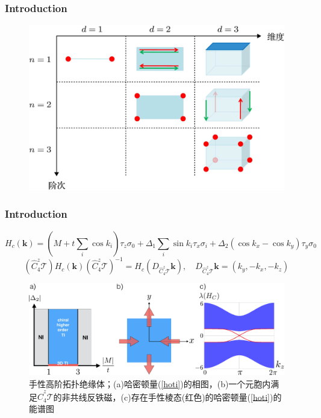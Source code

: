 \documentclass[10pt,aspectratio=169]{beamer} %
\begin{document}
\begin{frame}
	\frametitle{Introduction}
	\begin{figure}[h]
		\centering
		\includegraphics[scale=1.4]{pic/fig6}
	\end{figure}
\end{frame}
\begin{frame}
	\frametitle{Introduction}
	\begin{equation}
	H_c(\mathbf{k})=(M+t\sum_i\cos k_i)\tau_z\sigma_0+\Delta_1\sum_i\sin k_i\tau_x\sigma_i+\Delta_2(\cos k_x-\cos k_y)\tau_y\sigma_0\label{hoti}
	\end{equation}
	\begin{equation}
	(\hat{C}_4^z\mathcal{T})H_c(\mathbf{k})(\hat{C}_4^z\mathcal{T})^{-1}=H_c(D_{\hat{C}_4^z\mathcal{T}}\mathbf{k}),\quad D_{\hat{C}_4^z\mathcal{T}}\mathbf{k}=(k_y,-k_x,-k_z)
	\end{equation}
	\begin{figure}[h]
		\centering
		\includegraphics[scale=0.5]{pic/fig7}
		\caption{手性高阶拓扑绝缘体；(a)哈密顿量(\ref{hoti})的相图，(b)一个元胞内满足$\hat{C}_4^z\mathcal{T}$的非共线反铁磁，(c)存在手性棱态(红色)的哈密顿量(\ref{hoti})的能谱图}\label{fig7}
	\end{figure}
\end{frame}
\end{document}
